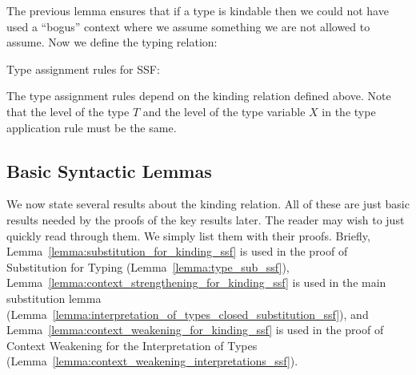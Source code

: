\noindent
The previous lemma ensures that if a type is kindable then we could
not have used a ``bogus'' context where we assume something we are not
allowed to assume.  Now we define the typing relation:
\begin{definition}
  \label{fig:typing_rules_ssf}
  Type assignment rules for SSF:
\end{definition}  
\noindent
The type assignment rules depend on the kinding relation defined
above.  Note that the level of the type $T$ and the level of the
type variable $X$ in the type application rule must be the same.

\subsection{Basic Syntactic Lemmas}
\label{subsec:basic_syntactic_lemmas}
We now state several results about the kinding relation. All of these
are just basic results needed by the proofs of the key results
later. The reader may wish to just quickly read through them.  We
simply list them with their proofs.  Briefly,
Lemma~\ref{lemma:substitution_for_kinding_ssf} is used in the proof of
Substitution for Typing (Lemma~\ref{lemma:type_sub_ssf}),
Lemma~\ref{lemma:context_strengthening_for_kinding_ssf} is used in the
main substitution lemma
(Lemma~\ref{lemma:interpretation_of_types_closed_substitution_ssf}),
and Lemma~\ref{lemma:context_weakening_for_kinding_ssf} is used in the
proof of Context Weakening for the Interpretation of Types
(Lemma~\ref{lemma:context_weakening_interpretations_ssf}).

